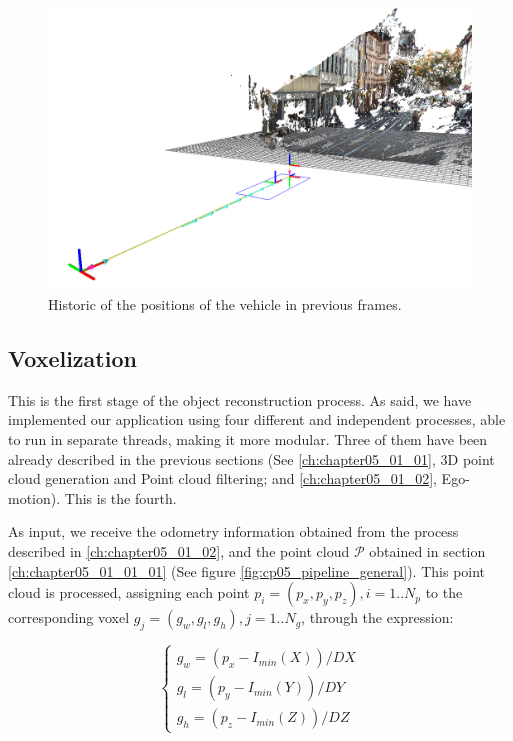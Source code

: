 \begin{figure}[t]
  \centering
  \includegraphics{tfs}
  \caption{Historic of the positions of the vehicle in previous frames.}\label{fig:cp05_tfs}
\end{figure}

\subsection{Voxelization}\label{ch:chapter05_01_03}

This is the first stage of the object reconstruction process. As said, we have implemented our application using four different and independent processes, able to run in separate threads, making it more modular. Three of them have been already described in the previous sections (See \ref{ch:chapter05_01_01}, 3D point cloud generation and Point cloud filtering; and \ref{ch:chapter05_01_02}, Ego-motion). This is the fourth.

As input, we receive the odometry information obtained from the process described in \ref{ch:chapter05_01_02}, and the point cloud $\mathcal{P}$ obtained in section \ref{ch:chapter05_01_01_01} (See figure \ref{fig:cp05_pipeline_general}). This point cloud is processed, assigning each point $p_i = (p_x, p_y, p_z), i=1..N_p$ to the corresponding voxel $g_j=(g_w, g_l, g_h), j=1..N_g$, through the expression:

\begin{equation}\label{eq:cp05_point_to_voxel}
\begin{cases}
g_w = (p_x - I_{min}(X)) / DX\\
g_l = (p_y - I_{min}(Y)) / DY\\
g_h = (p_z - I_{min}(Z)) / DZ
\end{cases}
\end{equation}

